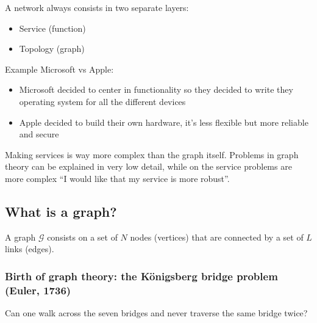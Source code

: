 A network always consists in two separate layers:
\begin{itemize}
  \item Service (function)
  \item Topology (graph)
\end{itemize}

Example Microsoft vs Apple:
\begin{itemize}
  \item Microsoft decided to center in functionality so they decided to write they operating
  system for all the different devices
  \item Apple decided to build their own hardware, it's less flexible but more reliable and secure
\end{itemize}

Making services is way more complex than the graph itself. Problems in graph theory can be 
explained in very low detail, while on the service problems are more complex ``I would like
that my service is more robust''. 

\subsection{What is a graph?}

A graph $\mathcal{G}$ consists on a set of $N$ nodes (vertices) that are connected by a set of 
$L$ links (edges).

\subsubsection{Birth of graph theory: the Königsberg bridge problem (Euler, 1736)}

Can one walk across the seven bridges and never traverse the same bridge twice?

\begin{figure}[H]
  \centering
\end{figure}

